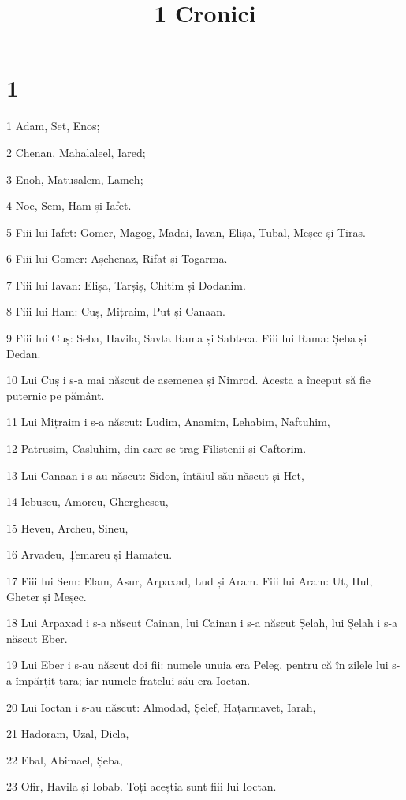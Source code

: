 

\title{1 Cronici}


\chapter{1}

\par 1 Adam, Set, Enos;
\par 2 Chenan, Mahalaleel, Iared;
\par 3 Enoh, Matusalem, Lameh;
\par 4 Noe, Sem, Ham și Iafet.
\par 5 Fiii lui Iafet: Gomer, Magog, Madai, Iavan, Elișa, Tubal, Meșec și Tiras.
\par 6 Fiii lui Gomer: Așchenaz, Rifat și Togarma.
\par 7 Fiii lui Iavan: Elișa, Tarșiș, Chitim și Dodanim.
\par 8 Fiii lui Ham: Cuș, Mițraim, Put și Canaan.
\par 9 Fiii lui Cuș: Seba, Havila, Savta Rama și Sabteca. Fiii lui Rama: Șeba și Dedan.
\par 10 Lui Cuș i s-a mai născut de asemenea și Nimrod. Acesta a început să fie puternic pe pământ.
\par 11 Lui Mițraim i s-a născut: Ludim, Anamim, Lehabim, Naftuhim,
\par 12 Patrusim, Casluhim, din care se trag Filistenii și Caftorim.
\par 13 Lui Canaan i s-au născut: Sidon, întâiul său născut și Het,
\par 14 Iebuseu, Amoreu, Ghergheseu,
\par 15 Heveu, Archeu, Sineu,
\par 16 Arvadeu, Țemareu și Hamateu.
\par 17 Fiii lui Sem: Elam, Asur, Arpaxad, Lud și Aram. Fiii lui Aram: Ut, Hul, Gheter și Meșec.
\par 18 Lui Arpaxad i s-a născut Cainan, lui Cainan i s-a născut Șelah, lui Șelah i s-a născut Eber.
\par 19 Lui Eber i s-au născut doi fii: numele unuia era Peleg, pentru că în zilele lui s-a împărțit țara; iar numele fratelui său era Ioctan.
\par 20 Lui Ioctan i s-au născut: Almodad, Șelef, Hațarmavet, Iarah,
\par 21 Hadoram, Uzal, Dicla,
\par 22 Ebal, Abimael, Șeba,
\par 23 Ofir, Havila și Iobab. Toți aceștia sunt fiii lui Ioctan.
